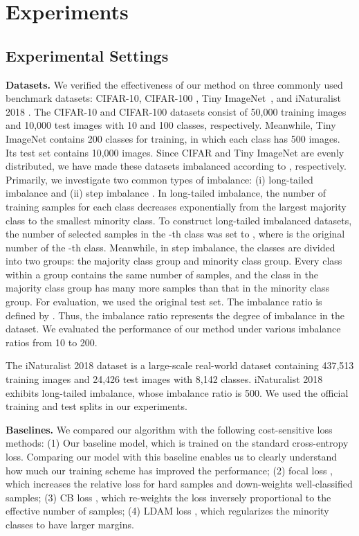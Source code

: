 \section{Experiments}

\subsection{Experimental Settings} \label{sub:exp_setting}
\textbf{Datasets.} We verified the effectiveness of our method on three commonly used benchmark datasets: CIFAR-10, CIFAR-100 \cite{ref:data_cifar}, Tiny ImageNet~\cite{data:tinyimagenet}, and iNaturalist 2018 \cite{ref:data_iNat}.
The CIFAR-10 and CIFAR-100 datasets consist of 50,000 training images and 10,000 test images with 10 and 100 classes, respectively. 
Meanwhile, Tiny ImageNet contains 200 classes for training, in which each class has 500 images. 
Its test set contains 10,000 images.
Since CIFAR and Tiny ImageNet are evenly distributed, we have made these datasets imbalanced according to \cite{ref:cui_belongie_cvpr19, ref:buda_mazurowski_2018}, respectively.
Primarily, we investigate two common types of imbalance: (i) long-tailed imbalance \cite{ref:cui_belongie_cvpr19} and (ii) step imbalance \cite{ref:buda_mazurowski_2018}.
In long-tailed imbalance, the number of training samples for each class decreases exponentially from the largest majority class to the smallest minority class. To construct long-tailed imbalanced datasets, the number of selected samples in the -th class was set to , where  is the original number of the -th class.
Meanwhile, in step imbalance, the classes are divided into two groups: the majority class group and minority class group. 
Every class within a group contains the same number of samples, and the class in the majority class group has many more samples than that in the minority class group.  
For evaluation, we used the original test set. 
The imbalance ratio  is defined by .
Thus, the imbalance ratio represents the degree of imbalance in the dataset. 
We evaluated the performance of our method under various imbalance ratios from 10 to 200.

The iNaturalist 2018 dataset is a large-scale real-world dataset containing 437,513 training images and 24,426 test images with 8,142 classes.
iNaturalist 2018 exhibits long-tailed imbalance, whose imbalance ratio is 500.
We used the official training and test splits in our experiments. \vspace{2mm}

\textbf{Baselines.}
We compared our algorithm with the following cost-sensitive loss methods:
(1) Our baseline model, which is trained on the standard cross-entropy loss. 
Comparing our model with this baseline enables us to clearly understand how much our training scheme has improved the performance;
(2) focal loss \cite{ref:lin_focal_loss_iccv17}, which increases the relative loss for hard samples and down-weights well-classified samples;
(3) CB loss \cite{ref:cui_belongie_cvpr19}, which re-weights the loss inversely proportional to the effective number of samples;
(4) LDAM loss \cite{ref:cao_ldam_neurips2019}, which regularizes the minority classes to have larger margins.  

